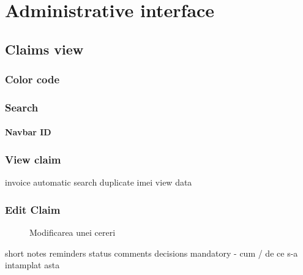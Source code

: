 \pagebreak
\section{Administrative interface}
	\subsection{Claims view}
		\subsubsection{Color code}
		\subsubsection{Search}
			\paragraph{Navbar ID}
		\subsubsection{View claim}
			invoice automatic search
			duplicate imei
			view data
		\subsubsection{Edit Claim}

		\begin{figure}
			\centering
			\caption{Modificarea unei cereri}
		\end{figure}
				short notes
				reminders
				status
				comments
				decisions mandatory - cum / de ce s-a intamplat asta
